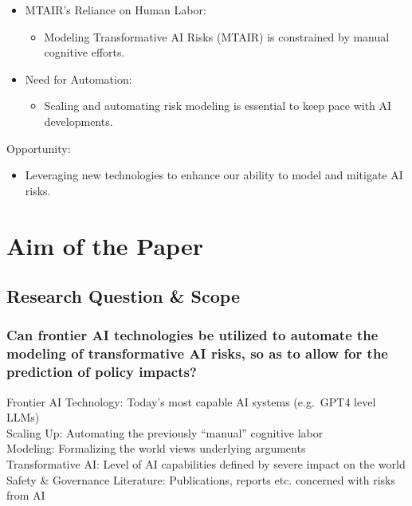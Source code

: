 \documentclass[
  letterpaper,
]{book}
\providecommand{\tightlist}{%
  \setlength{\itemsep}{0pt}\setlength{\parskip}{0pt}}
\begin{document}
\begin{itemize}
\tightlist
\item
  MTAIR's Reliance on Human Labor:

  \begin{itemize}
  \tightlist
  \item
    Modeling Transformative AI Risks (MTAIR) is constrained by manual
    cognitive efforts.\\
  \end{itemize}
\item
  Need for Automation:

  \begin{itemize}
  \tightlist
  \item
    Scaling and automating risk modeling is essential to keep pace with
    AI developments.
  \end{itemize}
\end{itemize}

Opportunity:

\begin{itemize}
\tightlist
\item
  Leveraging new technologies to enhance our ability to model and
  mitigate AI risks.
\end{itemize}

\section{Aim of the Paper}\label{aim-of-the-paper}

\subsection{Research Question \& Scope}\label{research-question-scope}

\subsubsection{Can frontier AI technologies be utilized to automate the
modeling of transformative AI risks, so as to allow for the prediction
of policy
impacts?}\label{can-frontier-ai-technologies-be-utilized-to-automate-the-modeling-of-transformative-ai-risks-so-as-to-allow-for-the-prediction-of-policy-impacts}

Frontier AI Technology: Today's most capable AI systems (e.g.~GPT4 level
LLMs)\\
Scaling Up: Automating the previously ``manual'' cognitive labor\\
Modeling: Formalizing the world views underlying arguments\\
Transformative AI: Level of AI capabilities defined by severe impact on
the world\\
Safety \& Governance Literature: Publications, reports etc. concerned
with risks from AI
\end{document}
